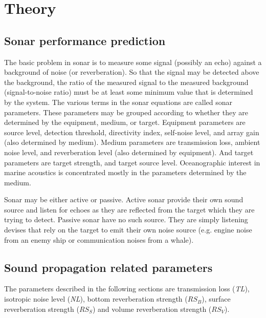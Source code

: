 \chapter{Theory} \label{Theory}

\section{ Sonar performance prediction } \label{ Sonar performance prediction }

\noindent The basic problem in sonar is to measure some signal (possibly an echo) against a background of noise (or reverberation). So that the signal may be detected above the background, the ratio of the measured signal to the measured background (signal-to-noise ratio) must be at least some minimum value that is determined by the system. The various terms in the sonar equations are called sonar parameters. These parameters may be grouped according to whether they are determined by the equipment, medium, or target. Equipment parameters are source level, detection threshold, directivity index, self-noise level, and array gain (also determined by medium). Medium parameters are transmission loss, ambient noise level, and reverberation level (also determined by equipment). And target parameters are target strength, and target source level. Oceanographic interest in marine acoustics is concentrated mostly in the parameters determined by the medium.

\noindent Sonar may be either active or passive. Active sonar provide their own sound source and listen for echoes as they are reflected from the target which they are trying to detect. Passive sonar have no such source. They are simply listening devises that rely on the target to emit their own noise source (e.g. engine noise from an enemy ship or communication noises from a whale).

\section{ Sound propagation related parameters } \label{ Sound propagation related parameters }

\noindent The parameters described in the following sections are transmission loss (\textit{TL}), isotropic noise level (\textit{NL}), bottom reverberation strength (\textit{$RS_B$}), surface reverberation strength (\textit{$RS_S$}) and volume reverberation strength (\textit{$RS_V$}).

